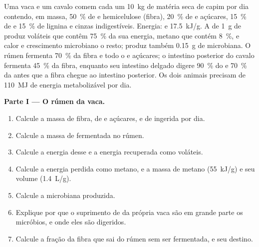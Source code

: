\begin{problem}
\label{pb:b1:digestion-absorption:1}
Uma vaca e um cavalo comem cada um \qty{10}{kg} de matéria seca de
capim por dia contendo, em massa, \qty{50}{\%} de  e
hemicelulose (fibra), \qty{20}{\%} de  e açúcares, \qty{15}{\%} de
 e \qty{15}{\%} de lignina e cinzas indigestíveis. Energia:
 e  \qty{17.5}{kJ/g}. A  de \qty{1}{g} de
 produz  voláteis que contêm \qty{75}{\%} da
sua energia, metano que contém \qty{8}{\%}, e calor e crescimento
microbiano o resto; produz também \qty{0.15}{g} de  microbiana.
O rúmen fermenta \qty{70}{\%} da fibra e todo o  e açúcares; o
intestino posterior do cavalo fermenta \qty{45}{\%} da fibra, enquanto
seu intestino delgado digere \qty{90}{\%} do  e \qty{70}{\%} da
 antes que a fibra chegue ao intestino posterior. Os dois
animais precisam de \qty{110}{MJ} de energia metabolizável por dia.

\medskip
\noindent\textbf{Parte I --- O rúmen da vaca.}
\begin{enumerate}
  \item Calcule a massa de fibra, de  e açúcares, e de 
        ingerida por dia.
  \item Calcule a massa de  fermentada no rúmen.
  \item Calcule a energia desse  e a energia recuperada
        como  voláteis.
  \item Calcule a energia perdida como metano, e a massa de metano
        (\qty{55}{kJ/g}) e seu volume (\qty{1.4}{L/g}).
  \item Calcule a  microbiana produzida.
  \item Explique por que o suprimento de  da própria vaca são
        em grande parte os micróbios, e onde eles são digeridos.
  \item Calcule a fração da fibra que sai do rúmen sem ser fermentada,
        e seu destino.
\end{enumerate}


\end{problem}
